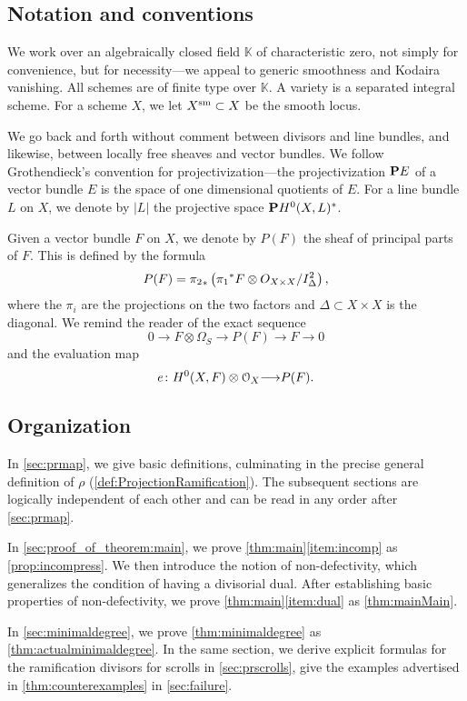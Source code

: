 \documentclass[11pt,reqno]{amsart}
\theoremstyle{plain}
\theoremstyle{definition}
\theoremstyle{remark}
\numberwithin{equation}{section}
\renewcommand{\k}{\mathbb{K}}
\renewcommand{\to}{{\longrightarrow}}
\numberwithin{equation}{section}
\renewcommand{\O}{\mathcal O}
\begin{document}
\subsection{Notation and conventions}
We work over an algebraically closed field $\k$ of characteristic zero, not simply for convenience, but for necessity---we appeal to generic smoothness and Kodaira vanishing.
All schemes are of finite type over $\k$.
A variety is a separated integral scheme.
For a scheme $X$, we let $X^{\rm sm} \subset X$ be the smooth locus.

We go back and forth without comment between divisors and line bundles, and likewise, between locally free sheaves and vector bundles.
We follow Grothendieck's convention for projectivization---the projectivization $\P E$ of a vector bundle $E$ is the space of one dimensional quotients of $E$.
For a line bundle $L$ on $X$, we denote by $|L|$ the projective space $\P H^0(X, L)^*$.

Given a vector bundle $F$ on $X$, we denote by $P(F)$ the sheaf of principal parts of $F$.
This is defined by the formula
\[ P(F) = {\pi_2}_* \left( {\pi_1}^* F \otimes \mathcal \O_{X \times X}/ I_{\Delta}^2 \right),\]
where the $\pi_i$ are the projections on the two factors and $\Delta \subset X \times X$ is the diagonal.
We remind the reader of the exact sequence
\[ 0 \to F \otimes \Omega_S \to P(F) \to F \to 0\]
and the evaluation map
\[ e \from H^0(X, F) \otimes \O_X \to P(F).\]

\subsection{Organization}
In \autoref{sec:prmap}, we give basic definitions, culminating in the precise general definition of $\rho$ (\autoref{def:ProjectionRamification}).
The subsequent sections are logically independent of each other and can be read in any order after \autoref{sec:prmap}.

In \autoref{sec:proof_of_theorem:main}, we prove \autoref{thm:main}\eqref{item:incomp} as \autoref{prop:incompress}.
We then introduce the notion of non-defectivity, which generalizes the condition of having a divisorial dual.
After establishing basic properties of non-defectivity, we prove \autoref{thm:main}\eqref{item:dual} as \autoref{thm:mainMain}.

In \autoref{sec:minimaldegree}, we prove \autoref{thm:minimaldegree} as \autoref{thm:actualminimaldegree}.
In the same section, we derive explicit formulas for the ramification divisors for scrolls in \autoref{sec:prscrolls}, give the examples advertised in \autoref{thm:counterexamples} in \autoref{sec:failure}.%
\end{document}
